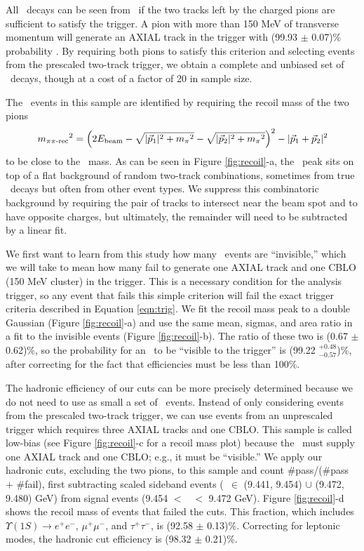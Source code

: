 \documentclass[aps,prd,preprint,superscriptaddress,tightenlines,nofootinbib,floatfix]{revtex4}
\begin{document}
All \uone\ decays can be seen from \twotoone\ if the two tracks left
by the charged pions are sufficient to satisfy the trigger.  A pion
with more than 150 MeV of transverse momentum will generate an AXIAL
track in the trigger with (99.93 $\pm$ 0.07)\% probability
\cite{inga}.  By requiring both pions to satisfy this criterion and
selecting events from the prescaled two-track trigger, we obtain a
complete and unbiased set of \uone\ decays, though at a cost of a
factor of 20 in sample size.

The \twotoone\ events in this sample are identified by requiring the
recoil mass of the two pions
\begin{equation}
  {m_{\mbox{\scriptsize $\pi\pi$-rec}}}^2 = \left(2 E_{\mbox{\scriptsize beam}} - \sqrt{|\vec{p}_1|^2 + {m_\pi}^2}
  - \sqrt{|\vec{p}_2|^2 + {m_\pi}^2}\right)^2 - |\vec{p}_1 + \vec{p}_2|^2
\end{equation}
to be close to the \uone\ mass.  As can be seen in Figure
\ref{fig:recoil}-a, the \uone\ peak sits on top of a flat background
of random two-track combinations, sometimes from true \twotoone\
decays but often from other event types.  We suppress this
combinatoric background by requiring the pair of tracks to intersect
near the beam spot and to have opposite charges, but ultimately, the
remainder will need to be subtracted by a linear fit.

We first want to learn from this study how many \uone\ events are
``invisible,'' which we will take to mean how many fail to generate
one AXIAL track and one CBLO (150 MeV cluster) in the trigger.  This
is a necessary condition for the analysis trigger, so any event that
fails this simple criterion will fail the exact trigger criteria
described in Equation \ref{eqn:trig}.  We fit the recoil mass peak to
a double Gaussian (Figure \ref{fig:recoil}-a) and use the same mean,
sigmas, and area ratio in a fit to the invisible events (Figure
\ref{fig:recoil}-b).  The ratio of these two is (0.67 $\pm$ 0.62)\%,
so the probability for an \uone\ to be ``visible to the trigger'' is
(99.22 $^{+0.48}_{-0.57}$)\%, after correcting for the fact that
efficiencies must be less than 100\%.

The hadronic efficiency of our cuts can be more precisely determined
because we do not need to use as small a set of \twotoone\ events.
Instead of only considering events from the prescaled two-track
trigger, we can use events from an unprescaled trigger which requires
three AXIAL tracks and one CBLO.  This sample is called low-bias (see
Figure \ref{fig:recoil}-c for a recoil mass plot) because the \uone\
must supply one AXIAL track and one CBLO; e.g., it must be
``visible.''  We apply our hadronic cuts, excluding the two pions, to
this sample and count \#pass/(\#pass $+$ \#fail), first subtracting
scaled sideband events (\mpprec\ $\in$ (9.441, 9.454) $\cup$ (9.472,
9.480) GeV) from signal events (9.454 $<$ \mpprec\ $<$ 9.472 GeV).
Figure \ref{fig:recoil}-d shows the recoil mass of events that failed
the cuts.  This fraction, which includes $\Upsilon(1S) \to e^+e^-$,
$\mu^+\mu^-$, and $\tau^+\tau^-$, is (92.58 $\pm$ 0.13)\%.  Correcting
for leptonic modes, the hadronic cut efficiency is (98.32 $\pm$
0.21)\%.
\end{document}
